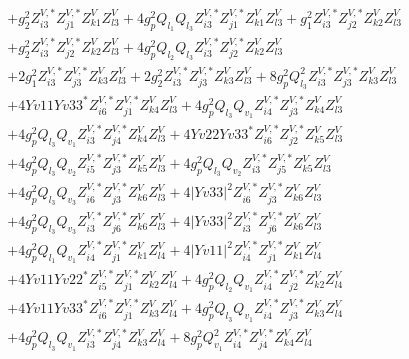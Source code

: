 \begin{align}
 &+g_{2}^{2} Z^{V,*}_{i 3} Z^{V,*}_{j 1} Z_{{k 1}}^{V} Z_{{l 3}}^{V} +4 g_{p}^{2} Q_{l_1} Q_{l_3} Z^{V,*}_{i 3} Z^{V,*}_{j 1} Z_{{k 1}}^{V} Z_{{l 3}}^{V} +g_{1}^{2} Z^{V,*}_{i 3} Z^{V,*}_{j 2} Z_{{k 2}}^{V} Z_{{l 3}}^{V} \nonumber \\ 
 &+g_{2}^{2} Z^{V,*}_{i 3} Z^{V,*}_{j 2} Z_{{k 2}}^{V} Z_{{l 3}}^{V} +4 g_{p}^{2} Q_{l_2} Q_{l_3} Z^{V,*}_{i 3} Z^{V,*}_{j 2} Z_{{k 2}}^{V} Z_{{l 3}}^{V} \nonumber \\ 
 &+2 g_{1}^{2} Z^{V,*}_{i 3} Z^{V,*}_{j 3} Z_{{k 3}}^{V} Z_{{l 3}}^{V} +2 g_{2}^{2} Z^{V,*}_{i 3} Z^{V,*}_{j 3} Z_{{k 3}}^{V} Z_{{l 3}}^{V} +8 g_{p}^{2} Q_{l_3}^{2} Z^{V,*}_{i 3} Z^{V,*}_{j 3} Z_{{k 3}}^{V} Z_{{l 3}}^{V} \nonumber \\ 
 &+4 Yv11 Yv33^* Z^{V,*}_{i 6} Z^{V,*}_{j 1} Z_{{k 4}}^{V} Z_{{l 3}}^{V} +4 g_{p}^{2} Q_{l_3} Q_{v_1} Z^{V,*}_{i 4} Z^{V,*}_{j 3} Z_{{k 4}}^{V} Z_{{l 3}}^{V} \nonumber \\ 
 &+4 g_{p}^{2} Q_{l_3} Q_{v_1} Z^{V,*}_{i 3} Z^{V,*}_{j 4} Z_{{k 4}}^{V} Z_{{l 3}}^{V} +4 Yv22 Yv33^* Z^{V,*}_{i 6} Z^{V,*}_{j 2} Z_{{k 5}}^{V} Z_{{l 3}}^{V} \nonumber \\ 
 &+4 g_{p}^{2} Q_{l_3} Q_{v_2} Z^{V,*}_{i 5} Z^{V,*}_{j 3} Z_{{k 5}}^{V} Z_{{l 3}}^{V} +4 g_{p}^{2} Q_{l_3} Q_{v_2} Z^{V,*}_{i 3} Z^{V,*}_{j 5} Z_{{k 5}}^{V} Z_{{l 3}}^{V} \nonumber \\ 
 &+4 g_{p}^{2} Q_{l_3} Q_{v_3} Z^{V,*}_{i 6} Z^{V,*}_{j 3} Z_{{k 6}}^{V} Z_{{l 3}}^{V} +4 |Yv33|^2 Z^{V,*}_{i 6} Z^{V,*}_{j 3} Z_{{k 6}}^{V} Z_{{l 3}}^{V} \nonumber \\ 
 &+4 g_{p}^{2} Q_{l_3} Q_{v_3} Z^{V,*}_{i 3} Z^{V,*}_{j 6} Z_{{k 6}}^{V} Z_{{l 3}}^{V} +4 |Yv33|^2 Z^{V,*}_{i 3} Z^{V,*}_{j 6} Z_{{k 6}}^{V} Z_{{l 3}}^{V} \nonumber \\ 
 &+4 g_{p}^{2} Q_{l_1} Q_{v_1} Z^{V,*}_{i 4} Z^{V,*}_{j 1} Z_{{k 1}}^{V} Z_{{l 4}}^{V} +4 |Yv11|^2 Z^{V,*}_{i 4} Z^{V,*}_{j 1} Z_{{k 1}}^{V} Z_{{l 4}}^{V} \nonumber \\ 
 &+4 Yv11 Yv22^* Z^{V,*}_{i 5} Z^{V,*}_{j 1} Z_{{k 2}}^{V} Z_{{l 4}}^{V} +4 g_{p}^{2} Q_{l_2} Q_{v_1} Z^{V,*}_{i 4} Z^{V,*}_{j 2} Z_{{k 2}}^{V} Z_{{l 4}}^{V} \nonumber \\ 
 &+4 Yv11 Yv33^* Z^{V,*}_{i 6} Z^{V,*}_{j 1} Z_{{k 3}}^{V} Z_{{l 4}}^{V} +4 g_{p}^{2} Q_{l_3} Q_{v_1} Z^{V,*}_{i 4} Z^{V,*}_{j 3} Z_{{k 3}}^{V} Z_{{l 4}}^{V} \nonumber \\ 
 &+4 g_{p}^{2} Q_{l_3} Q_{v_1} Z^{V,*}_{i 3} Z^{V,*}_{j 4} Z_{{k 3}}^{V} Z_{{l 4}}^{V} +8 g_{p}^{2} Q_{v_1}^{2} Z^{V,*}_{i 4} Z^{V,*}_{j 4} Z_{{k 4}}^{V} Z_{{l 4}}^{V} \nonumber \\ 

\end{align}
